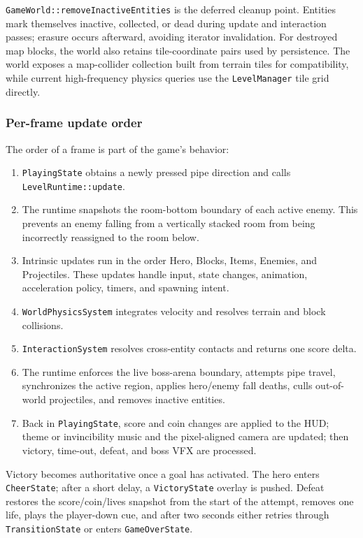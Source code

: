\texttt{GameWorld::removeInactiveEntities} is the deferred cleanup point.
Entities mark themselves inactive, collected, or dead during update and
interaction passes; erasure occurs afterward, avoiding iterator invalidation.
For destroyed map blocks, the world also retains tile-coordinate pairs used by
persistence.  The world exposes a map-collider collection built from terrain
tiles for compatibility, while current high-frequency physics queries use the
\texttt{LevelManager} tile grid directly.

\subsubsection{Per-frame update order}

The order of a frame is part of the game's behavior:

\begin{enumerate}
    \item \texttt{PlayingState} obtains a newly pressed pipe direction and
    calls \texttt{LevelRuntime::update}.
    \item The runtime snapshots the room-bottom boundary of each active enemy.
    This prevents an enemy falling from a vertically stacked room from being
    incorrectly reassigned to the room below.
    \item Intrinsic updates run in the order Hero, Blocks, Items, Enemies, and
    Projectiles.  These updates handle input, state changes, animation,
    acceleration policy, timers, and spawning intent.
    \item \texttt{WorldPhysicsSystem} integrates velocity and resolves terrain
    and block collisions.
    \item \texttt{InteractionSystem} resolves cross-entity contacts and returns
    one score delta.
    \item The runtime enforces the live boss-arena boundary, attempts pipe
    travel, synchronizes the active region, applies hero/enemy fall deaths,
    culls out-of-world projectiles, and removes inactive entities.
    \item Back in \texttt{PlayingState}, score and coin changes are applied to
    the HUD; theme or invincibility music and the pixel-aligned camera are
    updated; then victory, time-out, defeat, and boss VFX are processed.
\end{enumerate}

Victory becomes authoritative once a goal has activated.  The hero enters
\texttt{CheerState}; after a short delay, a \texttt{VictoryState} overlay is
pushed.  Defeat restores the score/coin/lives snapshot from the start of the
attempt, removes one life, plays the player-down cue, and after two seconds
either retries through \texttt{TransitionState} or enters
\texttt{GameOverState}.

